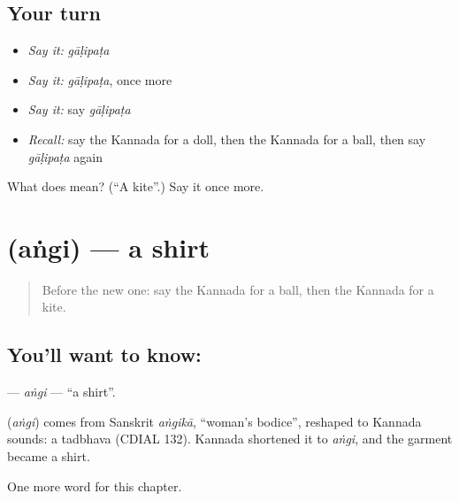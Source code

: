 \subsection*{Your turn}
\begin{itemize}
\raggedright
  \item \emph{Say it:} \emph{gāḷipaṭa}
  \item \emph{Say it:} \emph{gāḷipaṭa}, once more
  \item \emph{Say it:} say \emph{gāḷipaṭa}
  \item \emph{Recall:} say the Kannada for a doll, then the Kannada for a ball, then say \emph{gāḷipaṭa} again
\end{itemize}

\begin{tcolorbox}[breakable,colback=teal!4,colframe=teal!35!black,title={Before you move on}]
What does  mean? (\textquotedblleft{}A kite\textquotedblright{}.) Say it once more.
\end{tcolorbox}
\section[\texorpdfstring{\kn{ಅಂಗಿ} (aṅgi)}{ಅಂಗಿ (aṅgi)}]{ (aṅgi) — a shirt}

\label{lesson:KA-C120-angi}



\begin{quote}
Before the new one: say the Kannada for a ball, then the Kannada for a kite.
\end{quote}

\subsection*{You'll want to know: }
\textbf{} — \emph{aṅgi} — \textquotedblleft{}a shirt\textquotedblright{}.

\begin{cousinweb}
\textbf{} (\emph{aṅgi}) comes from Sanskrit \emph{aṅgikā}, \textquotedblleft{}woman's bodice\textquotedblright{}, reshaped to Kannada sounds: a tadbhava (CDIAL 132). Kannada shortened it to \emph{aṅgi}, and the garment became a shirt.
\end{cousinweb}

\begin{grammarlens}[title={What you've built}]
One more word for this chapter.
\end{grammarlens}

